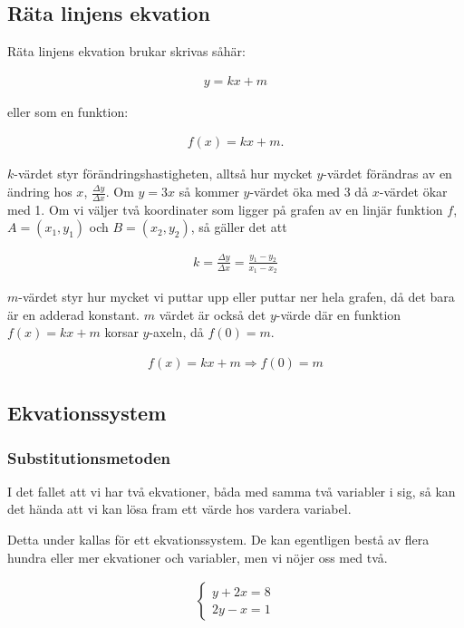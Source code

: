 \newpage
\subsection{Räta linjens ekvation}

Räta linjens ekvation brukar skrivas såhär:

\begin{align}
	y=kx+m
\end{align}

eller som en funktion:

\begin{align}
	f(x)=kx+m.
\end{align}

$k$-värdet styr förändringshastigheten, alltså hur mycket $y$-värdet förändras av en ändring hos $x$, $\frac{\Delta y}{\Delta x}$. Om $y = 3x$ så kommer $y$-värdet öka med $3$ då $x$-värdet ökar med 1. Om vi väljer två koordinater som ligger på grafen av en linjär funktion $f$, $A=(x_1,y_1)$ och $B=(x_2,y_2)$, så gäller det att

\begin{align}
	k = \frac{\Delta y}{\Delta x} = \frac{y_1-y_2}{x_1-x_2}
\end{align}

$m$-värdet styr hur mycket vi puttar upp eller puttar ner hela grafen, då det bara är en adderad konstant. $m$ värdet är också det $y$-värde där en funktion $f(x)=kx+m$ korsar $y$-axeln, då $f(0)=m$.

\begin{align}
	f(x) = kx+m \Rightarrow f(0) = m
\end{align}

\subsection{Ekvationssystem}

\subsubsection{Substitutionsmetoden}
\label{Substitutionsmetoden}

I det fallet att vi har två ekvationer, båda med samma två variabler i sig, så kan det hända att vi kan lösa fram ett värde hos vardera variabel.

Detta under kallas för ett ekvationssystem. De kan egentligen bestå av flera hundra eller mer ekvationer och variabler, men vi nöjer oss med två.

\begin{align}
	\begin{cases}
		y+2x=8 \\
		2y-x = 1
	\end{cases}
\end{align}

